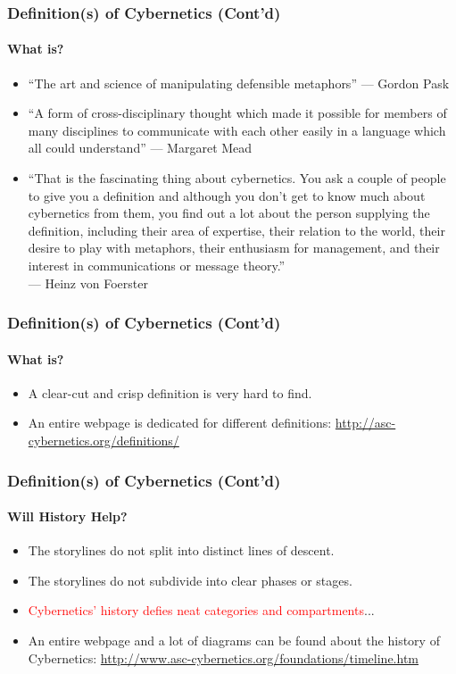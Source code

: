 		\begin{frame}
			\frametitle{Definition(s) of Cybernetics (Cont'd)}
			\framesubtitle{What is?}
			\begin{itemize}
				\item<1->``The art and science of manipulating defensible metaphors''
				--- Gordon Pask
				\item<2->``A form of cross-disciplinary thought which made it possible for members of many disciplines to communicate with each other easily in a language which all could understand''
				--- Margaret Mead
				\item<3->``That is the fascinating thing about cybernetics. You ask a couple of people to give you a definition and although you don’t get to know much about cybernetics from them, you find out a lot about the person supplying the definition, including their area of expertise, their relation to the world, their desire to play with metaphors, their enthusiasm for management, and their interest in communications or message theory.''\\
				--- Heinz von Foerster
			\end{itemize}
		\end{frame}
	
		\begin{frame}
			\frametitle{Definition(s) of Cybernetics (Cont'd)}
			\framesubtitle{What is?}
			\begin{itemize}
				\item A clear-cut and crisp definition is very hard to find.
				\item An entire webpage is dedicated for different definitions: \url{http://asc-cybernetics.org/definitions/}\\
			\end{itemize}
		\end{frame}
	
		\begin{frame}
			\setbeamercovered{transparent}
			\frametitle{Definition(s) of Cybernetics (Cont'd)}
			\framesubtitle{Will History Help?}
			\begin{itemize}
				\item<1->The storylines do not split into distinct lines of descent.
				\item<2->The storylines do not subdivide into clear phases or stages.
				\item<3->\textcolor{red}{Cybernetics' history defies neat categories and compartments}...
				\item<4->An entire webpage and a lot of diagrams can be found about the history of Cybernetics: \url{http://www.asc-cybernetics.org/foundations/timeline.htm}
			\end{itemize}
			\setbeamercovered{invisible}
		\end{frame}
	
